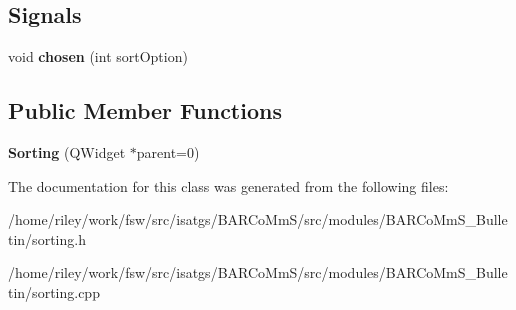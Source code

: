 \subsection*{Signals}
\begin{DoxyCompactItemize}
\item 
void {\bfseries chosen} (int sort\+Option)\hypertarget{class_sorting_ac5b16d5fb341031cd0a5c147729d9602}{}\label{class_sorting_ac5b16d5fb341031cd0a5c147729d9602}

\end{DoxyCompactItemize}
\subsection*{Public Member Functions}
\begin{DoxyCompactItemize}
\item 
{\bfseries Sorting} (Q\+Widget $\ast$parent=0)\hypertarget{class_sorting_a2612d18eb93b6c7fbf481ce574763f11}{}\label{class_sorting_a2612d18eb93b6c7fbf481ce574763f11}

\end{DoxyCompactItemize}


The documentation for this class was generated from the following files\+:\begin{DoxyCompactItemize}
\item 
/home/riley/work/fsw/src/isatgs/\+B\+A\+R\+Co\+Mm\+S/src/modules/\+B\+A\+R\+Co\+Mm\+S\+\_\+\+Bulletin/sorting.\+h\item 
/home/riley/work/fsw/src/isatgs/\+B\+A\+R\+Co\+Mm\+S/src/modules/\+B\+A\+R\+Co\+Mm\+S\+\_\+\+Bulletin/sorting.\+cpp\end{DoxyCompactItemize}

